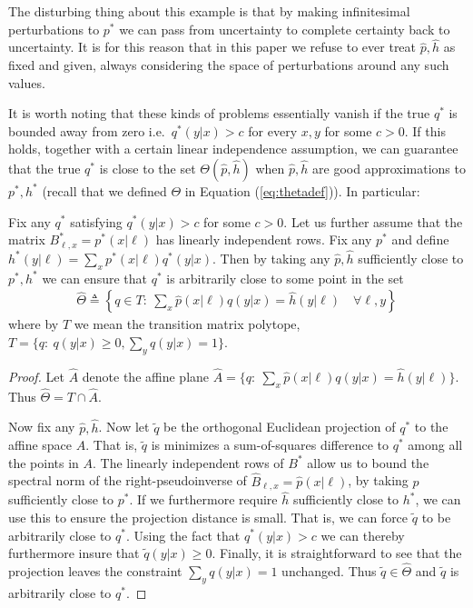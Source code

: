\begin{itemize}
The disturbing thing about this example is that by making infinitesimal perturbations to $p^*$ we can pass from uncertainty to complete certainty back to uncertainty.  It is for this reason that in this paper we refuse to ever treat $\hat p,\hat h$ as fixed and given, always considering the space of perturbations around any such values.  

It is worth noting that these kinds of problems essentially vanish if the true $q^*$ is bounded away from zero i.e.\ $q^*(y|x)>c$ for every $x,y$ for some $c>0$.  If this holds, together with a certain linear independence assumption, we can guarantee that the true $q^*$ is close to the set $\Theta(\hat p,\hat h)$ when $\hat p,\hat h$ are good approximations to $p^*,h^*$ (recall that we defined $\Theta$ in Equation (\ref{eq:thetadef})).  In particular:\vspace{.1in}

\begin{thm}\label{thm:mainthm}
Fix any $q^*$ satisfying $q^*(y|x)>c$ for some $c>0$.  Let us further assume that the matrix $B^*_{\ell,x}=p^*(x|\ell)$ has linearly independent rows.  Fix any $p^*$ and define $h^*(y|\ell)=\sum_x p^*(x|\ell)q^*(y|x)$.  Then by taking any $\hat p,\hat h$ sufficiently close to $p^*,h^*$ we can ensure that $q^*$ is arbitrarily close to some point in the set 
\begin{align}
\hat \Theta \triangleq \left\{q\in T:\ \sum_x \hat p(x|\ell)q(y|x)= \hat  h(y|\ell) \quad \forall \ell,y \right\}
\end{align}
where by $T$ we mean the transition matrix polytope, $T=\{q:\ q(y|x)\geq 0, \sum_y q(y|x)=1\}$.
\end{thm}
\begin{proof}
Let $\hat A$ denote the affine plane $\hat A=\{q:\ \sum_x \hat p(x|\ell)q(y|x)= \hat  h(y|\ell)\}$.  Thus $\hat \Theta = T \cap \hat A$.

Now fix any $\hat p,\hat h$.  Now let $\tilde q$ be the orthogonal Euclidean projection of $q^*$ to the affine space $A$.  That is, $\tilde q$ is minimizes a sum-of-squares difference to $q^*$ among all the points in $A$.  The linearly independent rows of $B^*$ allow us to bound the spectral norm of the right-pseudoinverse of $\hat B_{\ell,x}=\hat p(x|\ell)$, by taking $\hat p$ sufficiently close to $p^*$.  If we furthermore require $\hat h$ sufficiently close to $h^*$, we can use this to ensure the projection distance is small.  That is, we can force $\tilde q$ to be arbitrarily close to $q^*$.  Using the fact that $q^*(y|x)>c$ we can thereby furthermore insure that $\tilde q(y|x)\geq0$.  Finally, it is straightforward to see that the projection leaves the constraint $\sum_y q(y|x)=1$ unchanged.  Thus $\tilde q\in \hat \Theta$ and $\tilde q$ is arbitrarily close to $q^*$. 
\end{proof}


\end{itemize}
